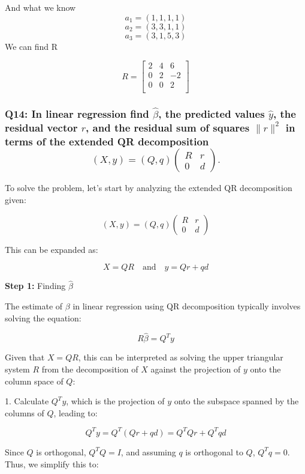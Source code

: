 \documentclass{article}
\begin{document}
And what we know
\[
a_{1} = (1,1,1,1)
\]
\[
a_{2} = (3,3,1,1)
\]
\[
a_{3} = (3,1,5,3)
\]
We can find R

\[
  R=
  \left[ {\begin{array}{ccc}
   2 & 4 & 6\\
   0 & 2 & -2\\
   0 & 0 & 2 \\
  \end{array} } \right]
\]

\subsubsection*{Q14: In linear regression find \(\hat{\beta}\), the predicted values \(\hat{y}\), the residual vector \(r\), and the residual sum of squares \(\|r\|^2\) in terms of the extended QR decomposition
\[
(X, y) = (Q, q) \left(\begin{array}{cc}
R & r \\
0 & d
\end{array}\right).
\]}

To solve the problem, let's start by analyzing the extended QR decomposition given:

\[ (X, y) = (Q, q) \left(\begin{array}{cc} R & r \\ 0 & d \end{array}\right) \]

This can be expanded as:

\[ X = QR \quad \text{and} \quad y = Qr + qd \]

\textbf{Step 1:} Finding \(\hat{\beta}\)

The estimate of \(\beta\) in linear regression using QR decomposition typically involves solving the equation:

\[ R\hat{\beta} = Q^T y \]

Given that \( X = QR \), this can be interpreted as solving the upper triangular system \( R \) from the decomposition of \( X \) against the projection of \( y \) onto the column space of \( Q \):

1. Calculate \( Q^T y \), which is the projection of \( y \) onto the subspace spanned by the columns of \( Q \), leading to:

\[ Q^T y = Q^T (Qr + qd) = Q^T Q r + Q^T q d \]

Since \( Q \) is orthogonal, \( Q^T Q = I \), and assuming \( q \) is orthogonal to \( Q \), \( Q^T q = 0 \). Thus, we simplify this to:
\end{document}
